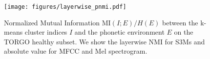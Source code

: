 \begin{figure}[t!]
    \centering
    \texttt{[image: figures/layerwise\_pnmi.pdf]}
    \caption{
        Normalized Mutual Information $\text{MI}(I; E)/H(E)$ between the k-means cluster indices $I$ and the phonetic environment $E$ on the TORGO healthy subset.
        We show the layerwise NMI for S3Ms and absolute value for MFCC and Mel spectrogram.
    }
    \label{fig:pnmi}
\end{figure}
